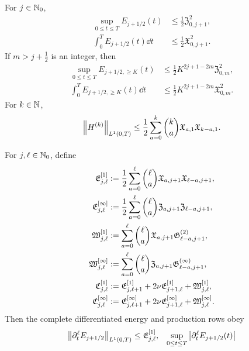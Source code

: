 {\begin{theorem}
For \(j\in\mathbb N_0\),
\begin{align}
 \sup_{0\le t\le T}E_{j+1/2}(t)
 &\le\frac12\mathfrak Z_{0,j+1}^2,
 \label{eq:qc-sharp-critical-sup}\\
 \int_0^TE_{j+1/2}(t)\dd t
 &\le\frac12\mathfrak X_{0,j+1}^2.
 \label{eq:qc-sharp-critical-mass}
\end{align}
If \(m>j+\frac12\) is an integer, then
\begin{align}
 \sup_{0\le t\le T}E_{j+1/2,\ge K}(t)
 &\le\frac12K^{2j+1-2m}\mathfrak Z_{0,m}^2,
 \label{eq:qc-sharp-critical-tail-sup}\\
 \int_0^TE_{j+1/2,\ge K}(t)\dd t
 &\le\frac12K^{2j+1-2m}\mathfrak X_{0,m}^2.
 \label{eq:qc-sharp-critical-tail-mass}
\end{align}
For \(k\in\mathbb N\),
\begin{equation}
 \left\lVert H^{(k)}\right\rVert_{L^1(0,T)}
 \le\frac12\sum_{a=0}^{k}\binom ka
 \mathfrak X_{a,1}\mathfrak X_{k-a,1}.
 \label{eq:qc-sharp-height-derivatives}
\end{equation}
\begin{samepage}
For \(j,\ell\in\mathbb N_0\), define
\begin{align}
 \mathfrak E_{j,\ell}^{[1]}
 &:=\frac12\sum_{a=0}^{\ell}\binom\ell a
 \mathfrak X_{a,j+1}\mathfrak X_{\ell-a,j+1},
 \notag\\
 \mathfrak E_{j,\ell}^{[\infty]}
 &:=\frac12\sum_{a=0}^{\ell}\binom\ell a
 \mathfrak Z_{a,j+1}\mathfrak Z_{\ell-a,j+1},
 \label{eq:qc-height-row-majorants}\\
 \mathfrak W_{j,\ell}^{[1]}
 &:=\sum_{a=0}^{\ell}\binom\ell a
 \mathfrak X_{a,j+1}\mathfrak G^{(2)}_{\ell-a,j+1},
 \notag\\
 \mathfrak W_{j,\ell}^{[\infty]}
 &:=\sum_{a=0}^{\ell}\binom\ell a
 \mathfrak Z_{a,j+1}\mathfrak G^{(\infty)}_{\ell-a,j+1},
 \label{eq:qc-force-work-row-majorants}\\
 \mathfrak C_{j,\ell}^{[1]}
 &:=\mathfrak E_{j,\ell+1}^{[1]}
    +2\nu\mathfrak E_{j+1,\ell}^{[1]}
    +\mathfrak W_{j,\ell}^{[1]},
 \notag\\
 \mathfrak C_{j,\ell}^{[\infty]}
 &:=\mathfrak E_{j,\ell+1}^{[\infty]}
    +2\nu\mathfrak E_{j+1,\ell}^{[\infty]}
    +\mathfrak W_{j,\ell}^{[\infty]}.
 \label{eq:qc-production-row-majorants}
\end{align}
Then the complete differentiated energy and production rows obey
\begin{align}
 \norm{\partial_t^\ell E_{j+1/2}}_{L^1(0,T)}
 &\le\mathfrak E_{j,\ell}^{[1]},
 &
 \sup_{0\le t\le T}
 \abs{\partial_t^\ell E_{j+1/2}(t)}

\end{align}
\end{samepage}
\end{theorem}}
